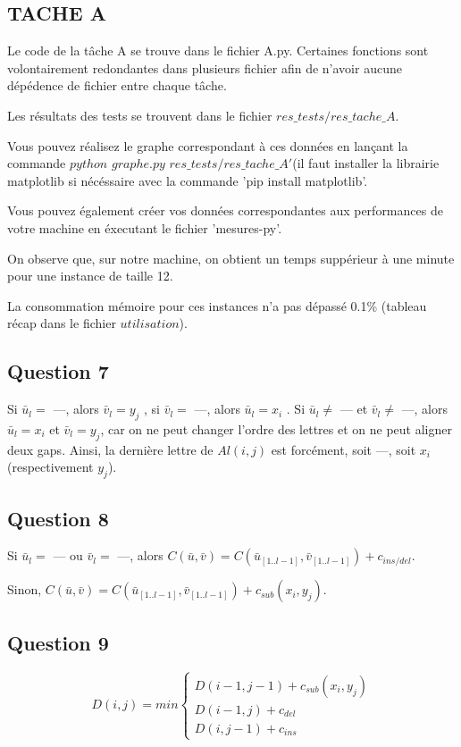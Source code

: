 \documentclass{report}
\begin{document}
 
 \begin{center}
 \subsection*{TACHE A}
Le code de la tâche A se trouve dans le fichier A.py. Certaines fonctions sont volontairement redondantes dans plusieurs fichier afin de n'avoir aucune dépédence de fichier entre chaque tâche.

Les résultats des tests se trouvent dans le fichier $res\_tests/res\_tache\_A$.

Vous pouvez réalisez le graphe correspondant à ces données en lançant la commande $python$ $graphe.py$ $res\_tests/res\_tache\_A' $(il faut installer la librairie matplotlib si nécéssaire avec la commande 'pip install matplotlib'.

Vous pouvez également créer vos données correspondantes aux performances de votre machine en éxecutant le fichier 'mesures-py'.

On observe que, sur notre machine, on obtient un temps suppérieur à une minute pour une instance de taille 12.

La consommation mémoire pour ces instances n'a pas dépassé 0.1\% (tableau récap dans le fichier $utilisation$).
 \end{center}


\clearpage

\subsection*{Question 7}
Si $\bar{u}_{l} = $ ---, alors $\bar{v}_{l} = y_{j}$ , si  $\bar{v}_{l} = $ ---, alors $\bar{u}_{l} = x_{i}$ . Si $\bar{u}_{l} \ne $ --- et $\bar{v}_{l} \ne $ ---, alors $\bar{u}_{l} = x_{i}$ et $\bar{v}_{l} = y_{j}$, car on ne peut changer l'ordre des lettres et on ne peut aligner deux gaps. Ainsi, la dernière lettre de $Al(i,j)$ est forcément, soit ---, soit $x_{i}$ (respectivement $y_{j}$).

\subsection*{Question 8}
Si $\bar{u}_{l} = $ --- ou $\bar{v}_{l} = $ ---, alors $C(\bar{u}, \bar{v}) = C(\bar{u}_{[1..l-1]}, \bar{v}_{[1..l-1]}) + c_{ins/del}$.

Sinon, $C(\bar{u}, \bar{v}) = C(\bar{u}_{[1..l-1]}, \bar{v}_{[1..l-1]}) + c_{sub}(x_{i},y_{j})$.


\subsection*{Question 9}
$$
D(i,j)= min\left\{
    \begin{array}{ll}
        D(i-1,j-1) + c_{sub}(x_{i},y_{j}) \\
        D(i-1,j) +  c_{del}\\
        D(i,j-1) +  c_{ins} 
    \end{array}
\right.
$$
\end{document}
